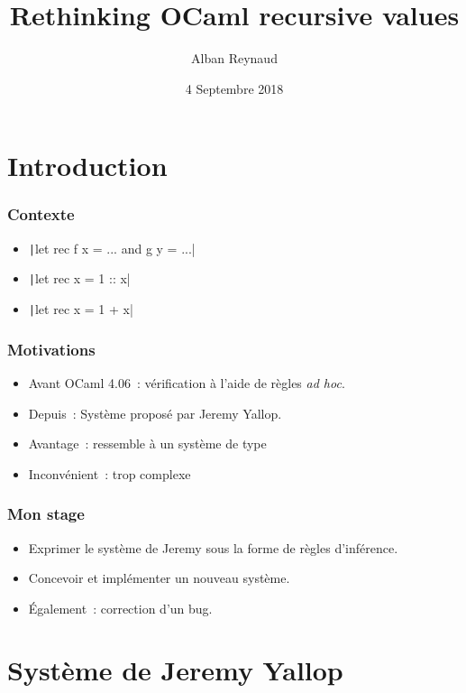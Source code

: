 \documentclass{beamer}
\title{Rethinking OCaml recursive values}
\author{Alban Reynaud}
\institute{Inria Saclay, équipe Parsifal, supersvisé par Gabriel Scherer}
\date{4 Septembre 2018}
\begin{document}
\begin{frame}
  \titlepage
\end{frame}

\begin{frame}
  \tableofcontents
\end{frame}

\section{Introduction}

\begin{frame}
  \frametitle{Contexte}
  \begin{itemize}
    \item \texttt|let rec f x = ... and g y = ...|
    \item \texttt|let rec x = 1 :: x|
    \item \texttt|let rec x = 1 + x|
  \end{itemize}
\end{frame}

\begin{frame}
  \frametitle{Motivations}
  \begin{itemize}
    \item Avant OCaml 4.06 : vérification à l'aide de règles \textit{ad hoc}.
    \item Depuis : Système proposé par Jeremy Yallop.
    \item Avantage : ressemble à un système de type
    \item Inconvénient : trop complexe
  \end{itemize}
\end{frame}

\begin{frame}
  \frametitle{Mon stage}
  \begin{itemize}
    \item Exprimer le système de Jeremy sous la forme de règles d'inférence.
    \item Concevoir et implémenter un nouveau système.
    \item Également : correction d'un bug.
  \end{itemize}
\end{frame}

\section{Système de Jeremy Yallop}
\end{document}
